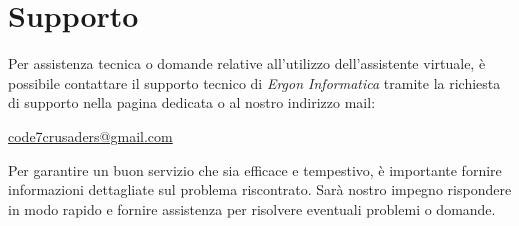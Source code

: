 \section{Supporto}
Per assistenza tecnica o domande relative all'utilizzo dell'assistente virtuale, è possibile contattare il supporto tecnico di \textit{Ergon Informatica} tramite la richiesta di supporto nella pagina dedicata o al nostro indirizzo mail:  
\begin{center}
    \href{mailto:code7crusaders@gmail.com}{code7crusaders@gmail.com}  
\end{center}
Per garantire un buon servizio che sia efficace e tempestivo, è importante fornire informazioni dettagliate sul problema riscontrato. Sarà nostro impegno rispondere in modo rapido e fornire assistenza per risolvere eventuali problemi o domande.